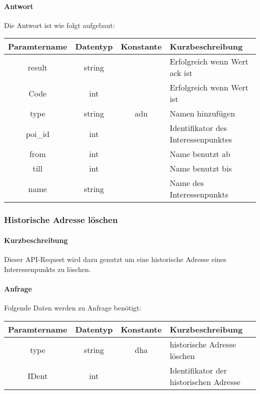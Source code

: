 \paragraph{Antwort}Die Antwort ist wie folgt aufgebaut:
\begin{table}[H]
	\begin{tabular}{|c|c|c|p{6.5cm}|}
		\hline
		\textbf{Paramtername} & \textbf{Datentyp} & \textbf{Konstante} & \textbf{Kurzbeschreibung}                                                                                               \\ \hline
		result              & string           &                 & Erfolgreich wenn Wert {\glqq ack\grqq} ist \\ \hline
		Code                & int              &                 & Erfolgreich wenn Wert {\glqq 0\grqq} ist \\ \hline
		type                & string           & adn             & Namen hinzufügen \\ \hline
		poi\_id             & int              &                 & Identifikator des Interessenpunktes \\ \hline
		from                & int              &                 & Name benutzt ab \\ \hline
		till                & int              &                 & Name benutzt bis \\ \hline
 		name                & string           &                 & Name des Interessenpunkts \\ \hline
	\end{tabular}
\end{table}
\subsubsection{Historische Adresse löschen}
\paragraph{Kurzbeschreibung}Dieser API-Request wird dazu genutzt um eine historische Adresse eines Interessenpunkts zu löschen.
\paragraph{Anfrage}Folgende Daten werden zu Anfrage benötigt:
\begin{table}[H]
	\begin{tabular}{|c|c|c|p{6.5cm}|}
		\hline
		\textbf{Paramtername} & \textbf{Datentyp} & \textbf{Konstante} & \textbf{Kurzbeschreibung}                                                                                               \\ \hline
		type                & string            & dha                & historische Adresse löschen \\ \hline
		IDent               & int               &                    & Identifikator der historischen Adresse \\ \hline
	\end{tabular}
\end{table}
